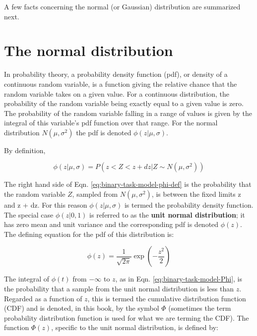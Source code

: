 \documentclass[
]{book}
\begin{document}
A few facts concerning the normal (or Gaussian) distribution are summarized next.

\hypertarget{binary-task-model-normal-distribution}{%
\section{The normal distribution}\label{binary-task-model-normal-distribution}}

In probability theory, a probability density function (pdf), or density of a continuous random variable, is a function giving the relative chance that the random variable takes on a given value. For a continuous distribution, the probability of the random variable being exactly equal to a given value is zero. The probability of the random variable falling in a range of values is given by the integral of this variable's pdf function over that range. For the normal distribution \(N(\mu,\sigma^2)\) the pdf is denoted \(\phi(z|\mu,\sigma)\).

By definition,

\begin{equation} 
\phi\left ( z|\mu,\sigma \right )=P(z<Z<z+dz|Z \sim N(\mu,\sigma^2))
\label{eq:binary-task-model-phi-def}
\end{equation}

The right hand side of Eqn. \eqref{eq:binary-task-model-phi-def} is the probability that the random variable \(Z\), sampled from \(N(\mu,\sigma^2)\), is between the fixed limits z and z + dz. For this reason \(\phi(z|\mu,\sigma)\) is termed the probability density function. The special case \(\phi(z|0,1)\) is referred to as the \textbf{unit normal distribution}; it has zero mean and unit variance and the corresponding pdf is denoted \(\phi(z)\). The defining equation for the pdf of this distribution is:

\begin{equation} 
\phi\left ( z \right )=\frac{1}{\sqrt{2\pi}}\exp\left ( -\frac{z^2}{2} \right )
\label{eq:binary-task-model-phi}
\end{equation}

The integral of \(\phi(t)\) from \(-\infty\) to \(z\), as in Eqn. \eqref{eq:binary-task-model-Phi}, is the probability that a sample from the unit normal distribution is less than \(z\). Regarded as a function of \(z\), this is termed the cumulative distribution function (CDF) and is denoted, in this book, by the symbol \(\Phi\) (sometimes the term probability distribution function is used for what we are terming the CDF). The function \(\Phi(z)\), specific to the unit normal distribution, is defined by:
\end{document}
